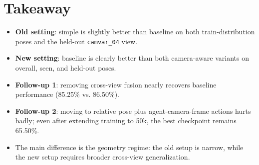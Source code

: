 \documentclass[11pt]{article}
\begin{document}
\section{Takeaway}
\begin{itemize}
    \item \textbf{Old setting}: simple is slightly better than baseline on both train-distribution poses and the held-out \texttt{camvar\_04} view.
    \item \textbf{New setting}: baseline is clearly better than both camera-aware variants on overall, seen, and held-out poses.
    \item \textbf{Follow-up 1}: removing cross-view fusion nearly recovers baseline performance (85.25\% vs. 86.50\%).
    \item \textbf{Follow-up 2}: moving to relative pose plus agent-camera-frame actions hurts badly; even after extending training to 50k, the best checkpoint remains 65.50\%.
    \item The main difference is the geometry regime: the old setup is narrow, while the new setup requires broader cross-view generalization.
\end{itemize}
\end{document}
